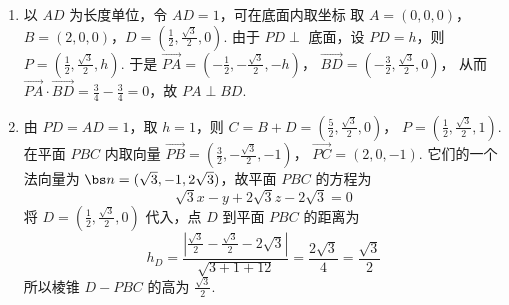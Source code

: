 \begin{solution}
\begin{enumerate}
\item 以 \(AD\) 为长度单位，令 \(AD=1\)，可在底面内取坐标
    取 \(A=(0,0,0)\)，\(B=(2,0,0)\)，\(D=\left(\frac{1}{2},\frac{\sqrt{3}}{2},0\right)\).
由于 \(PD\perp\) 底面，设 \(PD=h\)，则 \(P=\left(\frac{1}{2},\frac{\sqrt{3}}{2},h\right)\). 于是
    \(\overrightarrow{PA}=\left(-\frac{1}{2},-\frac{\sqrt{3}}{2},-h\right)\)，
    \(\overrightarrow{BD}=\left(-\frac{3}{2},\frac{\sqrt{3}}{2},0\right)\)，
从而 \(\overrightarrow{PA}\cdot\overrightarrow{BD}=\frac{3}{4}-\frac{3}{4}=0\)，故 \(PA\perp BD\).
\item 由 \(PD=AD=1\)，取 \(h=1\)，则
    \(C=B+D=\left(\frac{5}{2},\frac{\sqrt{3}}{2},0\right)\)，
    \(P=\left(\frac{1}{2},\frac{\sqrt{3}}{2},1\right)\).
    在平面 \(PBC\) 内取向量
    \(\overrightarrow{PB}=\left(\frac{3}{2},-\frac{\sqrt{3}}{2},-1\right)\)，
    \(\overrightarrow{PC}=\left(2,0,-1\right)\).
它们的一个法向量为 \(\bs n=(\sqrt{3},-1,2\sqrt{3})\)，故平面 \(PBC\) 的方程为
\[
\sqrt{3}x-y+2\sqrt{3}z-2\sqrt{3}=0
\]
将 \(D=\left(\frac{1}{2},\frac{\sqrt{3}}{2},0\right)\) 代入，点 \(D\) 到平面 \(PBC\) 的距离为
\[
h_D=\frac{\left|\frac{\sqrt{3}}{2}-\frac{\sqrt{3}}{2}-2\sqrt{3}\right|}{\sqrt{3+1+12}}
=\frac{2\sqrt{3}}{4}
=\frac{\sqrt{3}}{2}
\]
所以棱锥 \(D-PBC\) 的高为 \(\frac{\sqrt{3}}{2}\).
\end{enumerate}
\end{solution}

